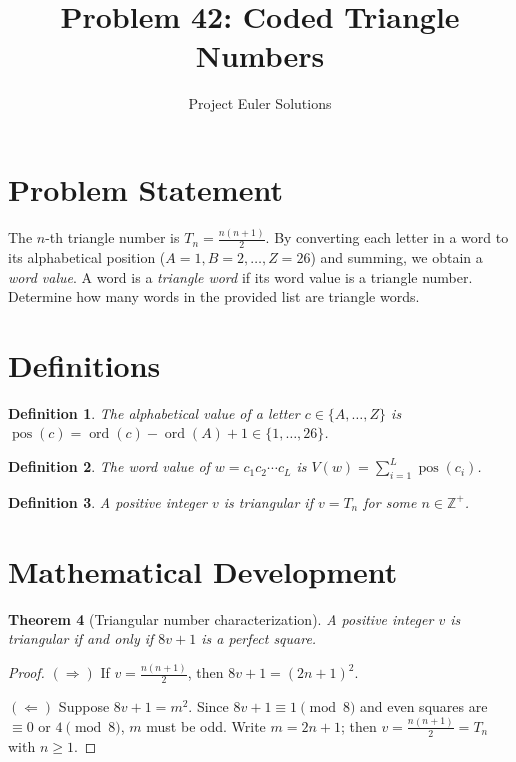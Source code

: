 \documentclass[12pt]{article}
\title{Problem 42: Coded Triangle Numbers}
\author{Project Euler Solutions}
\date{}
\newtheorem{theorem}{Theorem}
\newtheorem{definition}[theorem]{Definition}
\begin{document}
\maketitle

\section{Problem Statement}

The $n$-th triangle number is $T_n = \frac{n(n+1)}{2}$. By converting each letter in a word to its alphabetical position ($A=1, B=2, \ldots, Z=26$) and summing, we obtain a \emph{word value}. A word is a \emph{triangle word} if its word value is a triangle number. Determine how many words in the provided list are triangle words.

\section{Definitions}

\begin{definition}
The \emph{alphabetical value} of a letter $c \in \{A, \ldots, Z\}$ is $\operatorname{pos}(c) = \operatorname{ord}(c) - \operatorname{ord}(A) + 1 \in \{1, \ldots, 26\}$.
\end{definition}

\begin{definition}
The \emph{word value} of $w = c_1 c_2 \cdots c_L$ is $V(w) = \sum_{i=1}^{L} \operatorname{pos}(c_i)$.
\end{definition}

\begin{definition}
A positive integer $v$ is \emph{triangular} if $v = T_n$ for some $n \in \mathbb{Z}^+$.
\end{definition}

\section{Mathematical Development}

\begin{theorem}[Triangular number characterization]
A positive integer $v$ is triangular if and only if $8v + 1$ is a perfect square.
\end{theorem}

\begin{proof}
$(\Rightarrow)$ If $v = \frac{n(n+1)}{2}$, then $8v + 1 = (2n+1)^2$.

$(\Leftarrow)$ Suppose $8v + 1 = m^2$. Since $8v + 1 \equiv 1 \pmod{8}$ and even squares are $\equiv 0$ or $4 \pmod{8}$, $m$ must be odd. Write $m = 2n + 1$; then $v = \frac{n(n+1)}{2} = T_n$ with $n \geq 1$.
\end{proof}
\end{document}
